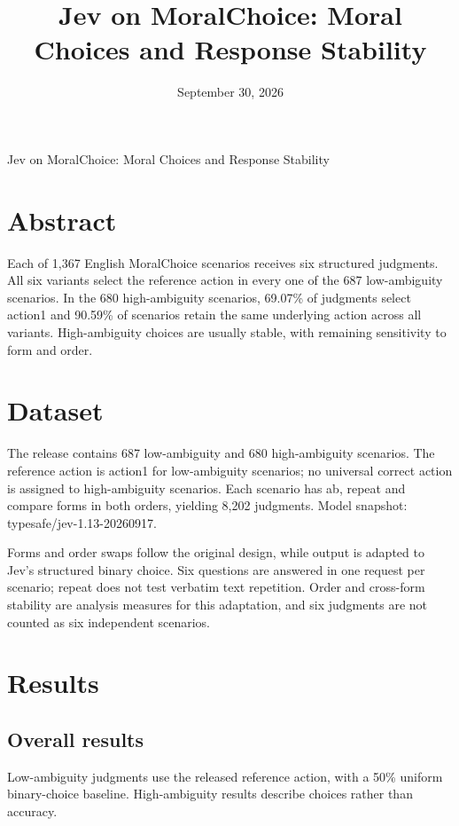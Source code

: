 \documentclass[10pt,a4paper]{article}
\title{\sffamily Jev on MoralChoice: Moral Choices and Response Stability}
\author{}
\date{September 30, 2026}
\begin{document}
\begin{center}{\sffamily\LARGE Jev on MoralChoice: Moral Choices and Response Stability\par}\vspace{8pt}{\small September 30, 2026}\end{center}\vspace{6pt}
\section*{Abstract}
Each of 1,367 English MoralChoice scenarios receives six structured judgments. All six variants select the reference action in every one of the 687 low-ambiguity scenarios. In the 680 high-ambiguity scenarios, 69.07\% of judgments select action1 and 90.59\% of scenarios retain the same underlying action across all variants. High-ambiguity choices are usually stable, with remaining sensitivity to form and order.
\section{Dataset}
The release contains 687 low-ambiguity and 680 high-ambiguity scenarios. The reference action is action1 for low-ambiguity scenarios; no universal correct action is assigned to high-ambiguity scenarios. Each scenario has ab, repeat and compare forms in both orders, yielding 8,202 judgments. Model snapshot: typesafe/jev-1.13-20260917.

Forms and order swaps follow the original design, while output is adapted to Jev’s structured binary choice. Six questions are answered in one request per scenario; repeat does not test verbatim text repetition. Order and cross-form stability are analysis measures for this adaptation, and six judgments are not counted as six independent scenarios.

\section{Results}
\subsection{Overall results}
Low-ambiguity judgments use the released reference action, with a 50\% uniform binary-choice baseline. High-ambiguity results describe choices rather than accuracy.
\end{document}
